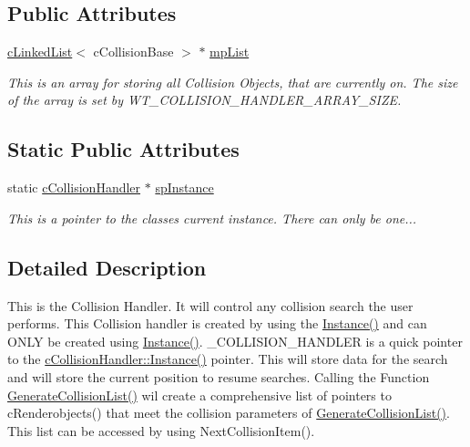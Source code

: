 \subsection*{Public Attributes}
\begin{DoxyCompactItemize}
\item 
\hypertarget{classc_collision_handler_aa99e11002172cbd1083158320e8d7cca}{
\hyperlink{classc_linked_list}{cLinkedList}$<$ cCollisionBase $>$ $\ast$ \hyperlink{classc_collision_handler_aa99e11002172cbd1083158320e8d7cca}{mpList}}
\label{classc_collision_handler_aa99e11002172cbd1083158320e8d7cca}

\begin{DoxyCompactList}\small\item\em This is an array for storing all Collision Objects, that are currently on. The size of the array is set by WT\_\-COLLISION\_\-HANDLER\_\-ARRAY\_\-SIZE. \end{DoxyCompactList}\end{DoxyCompactItemize}
\subsection*{Static Public Attributes}
\begin{DoxyCompactItemize}
\item 
\hypertarget{classc_collision_handler_ae020327c284763548d259a3d35a8f537}{
static \hyperlink{classc_collision_handler}{cCollisionHandler} $\ast$ \hyperlink{classc_collision_handler_ae020327c284763548d259a3d35a8f537}{spInstance}}
\label{classc_collision_handler_ae020327c284763548d259a3d35a8f537}

\begin{DoxyCompactList}\small\item\em This is a pointer to the classes current instance. There can only be one... \end{DoxyCompactList}\end{DoxyCompactItemize}


\subsection{Detailed Description}
This is the Collision Handler. It will control any collision search the user performs. This Collision handler is created by using the \hyperlink{classc_collision_handler_a04d5c8d5b7ac854b4958dca195bf1c1b}{Instance()} and can ONLY be created using \hyperlink{classc_collision_handler_a04d5c8d5b7ac854b4958dca195bf1c1b}{Instance()}. \_\-COLLISION\_\-HANDLER is a quick pointer to the \hyperlink{classc_collision_handler_a04d5c8d5b7ac854b4958dca195bf1c1b}{cCollisionHandler::Instance()} pointer. This will store data for the search and will store the current position to resume searches. Calling the Function \hyperlink{classc_collision_handler_ae624b12e08bdae8b2dd252bcfa6f7d36}{GenerateCollisionList()} wil create a comprehensive list of pointers to cRenderobjects() that meet the collision parameters of \hyperlink{classc_collision_handler_ae624b12e08bdae8b2dd252bcfa6f7d36}{GenerateCollisionList()}. This list can be accessed by using NextCollisionItem(). 

